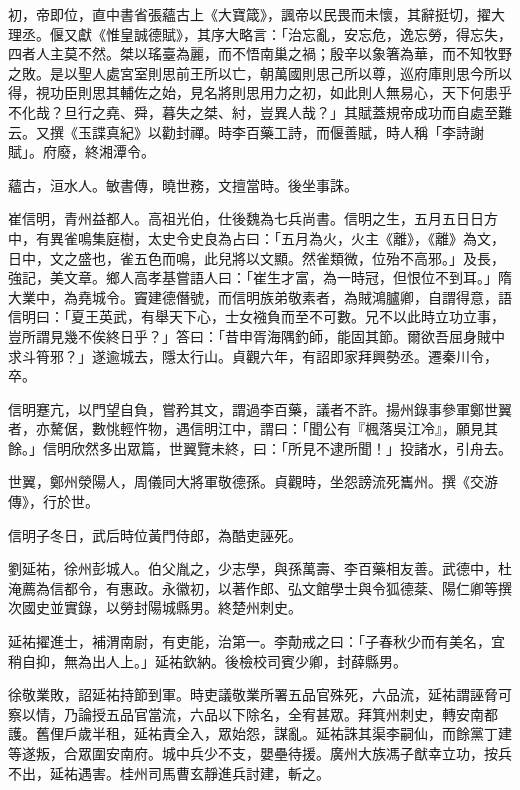 \begin{pinyinscope}
 初，帝即位，直中書省張蘊古上《大寶箴》，諷帝以民畏而未懷，其辭挺切，擢大理丞。偃又獻《惟皇誠德賦》，其序大略言：「治忘亂，安忘危，逸忘勞，得忘失，四者人主莫不然。桀以瑤臺為麗，而不悟南巢之禍；殷辛以象箸為華，而不知牧野之敗。是以聖人處宮室則思前王所以亡，朝萬國則思己所以尊，巡府庫則思今所以得，視功臣則思其輔佐之始，見名將則思用力之初，如此則人無易心，天下何患乎不化哉？旦行之堯、舜，暮失之桀、紂，豈異人哉？」其賦蓋規帝成功而自處至難云。又撰《玉諜真紀》以勸封禪。時李百藥工詩，而偃善賦，時人稱「李詩謝賦」。府廢，終湘潭令。



 蘊古，洹水人。敏書傳，曉世務，文擅當時。後坐事誅。



 崔信明，青州益都人。高祖光伯，仕後魏為七兵尚書。信明之生，五月五日日方中，有異雀鳴集庭樹，太史令史良為占曰：「五月為火，火主《離》，《離》為文，日中，文之盛也，雀五色而鳴，此兒將以文顯。然雀類微，位殆不高邪。」及長，強記，美文章。鄉人高孝基嘗語人曰：「崔生才富，為一時冠，但恨位不到耳。」隋大業中，為堯城令。竇建德僭號，而信明族弟敬素者，為賊鴻臚卿，自謂得意，語信明曰：「夏王英武，有舉天下心，士女襁負而至不可數。兄不以此時立功立事，豈所謂見幾不俟終日乎？」答曰：「昔申胥海隅釣師，能固其節。爾欲吾屈身賊中求斗筲邪？」遂逾城去，隱太行山。貞觀六年，有詔即家拜興勢丞。遷秦川令，卒。



 信明蹇亢，以門望自負，嘗矜其文，謂過李百藥，議者不許。揚州錄事參軍鄭世翼者，亦驁倨，數恌輕忤物，遇信明江中，謂曰：「聞公有『楓落吳江冷』，願見其餘。」信明欣然多出眾篇，世翼覽未終，曰：「所見不逮所聞！」投諸水，引舟去。



 世翼，鄭州滎陽人，周儀同大將軍敬德孫。貞觀時，坐怨謗流死巂州。撰《交游傳》，行於世。



 信明子冬日，武后時位黃門侍郎，為酷吏誣死。



 劉延祐，徐州彭城人。伯父胤之，少志學，與孫萬壽、李百藥相友善。武德中，杜淹薦為信都令，有惠政。永徽初，以著作郎、弘文館學士與令狐德棻、陽仁卿等撰次國史並實錄，以勞封陽城縣男。終楚州刺史。



 延祐擢進士，補渭南尉，有吏能，治第一。李勣戒之曰：「子春秋少而有美名，宜稍自抑，無為出人上。」延祐欽納。後檢校司賓少卿，封薛縣男。



 徐敬業敗，詔延祐持節到軍。時吏議敬業所署五品官殊死，六品流，延祐謂誣脅可察以情，乃論授五品官當流，六品以下除名，全宥甚眾。拜箕州刺史，轉安南都護。舊俚戶歲半租，延祐責全入，眾始怨，謀亂。延祐誅其渠李嗣仙，而餘黨丁建等遂叛，合眾圍安南府。城中兵少不支，嬰壘待援。廣州大族馮子猷幸立功，按兵不出，延祐遇害。桂州司馬曹玄靜進兵討建，斬之。




\end{pinyinscope}
